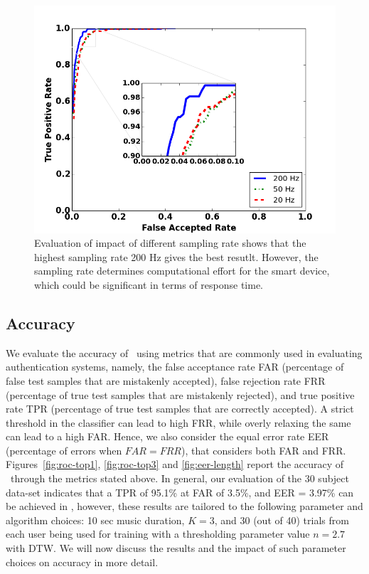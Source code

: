 \begin{figure}
\includegraphics[width=\columnwidth]{figure/roc_dtw_diff_freq.png}
\caption{\label{fig:roc_dtw_diff_freq} Evaluation of impact of different sampling rate shows that the highest sampling rate 200 Hz gives the best resutlt. However, the sampling rate determines computational effort for the smart device, which could be significant in terms of response time.}
\end{figure}


\subsection{Accuracy}
We evaluate the accuracy of \systemname~using metrics that are commonly used 
in evaluating authentication systems, namely,
the false acceptance rate FAR (percentage of false test samples that are 
mistakenly accepted), false rejection rate FRR (percentage of true test 
samples that are mistakenly rejected), and true positive rate 
TPR (percentage of true test samples that are correctly accepted). 
A strict threshold in the classifier can lead to high FRR, while 
overly relaxing the same can lead to a high FAR. Hence, we also consider 
the equal error rate EER (percentage of errors when $FAR = FRR$), that 
considers both FAR and FRR.
Figures~\ref{fig:roc-top1}, \ref{fig:roc-top3} and \ref{fig:eer-length} report 
the accuracy 
of \systemname~through the metrics stated above. 
In general, our evaluation of the 30 subject data-set indicates that a 
TPR of 95.1\% at FAR of 3.5\%, and EER = 3.97\% can be achieved in 
\systemname, however, these results are tailored to the following parameter 
and algorithm choices:
10 sec music duration, $K = 3$, and 30 (out of 40) trials from each user being 
used for training with a thresholding parameter value $n = 2.7$ with DTW. 
We will now discuss the results and the impact of such parameter choices 
on accuracy in more detail.
